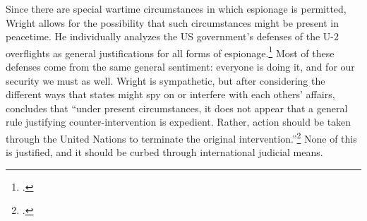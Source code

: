 \documentclass{memoir}
\begin{document}
\begin{refsegment}
Since there are special wartime circumstances in which espionage is permitted, Wright allows for the possibility that such circumstances might be present in peacetime. He individually analyzes the US government's defenses of the U-2 overflights as general justifications for all forms of espionage.\footcite[p.~17. A fun question to ask yourself is whether putting human spies and overflights in the same category elevates the severity of human intelligence or minimizes that of overflights. I think it actually does both, and Wright seems to agree. An overflying plane is clearly capable of greater physical destruction but ``the difference should not be exaggerated. Although a reconnaissance airplane may carry bombs, a secret agent may plant a bomb and engage in various forms of sabotage.'' (p. 21) The general lack of concern that a spy plane might be carrying bombs is consistently surprising to me. Many of these flights were in retrofitted bombers, completely indistinguishable to enemies from their heavily-armed counterparts. Nonethless, both sides seem willing to treat reconnaissance flights as their own separate thing, and that protection applies to spies as well. As long as spies \emph{don't} engage in sabotage, the fact that they have the potential to do so is irrelevant.]{wright_espionage_1962} Most of these defenses come from the same general sentiment: everyone is doing it, and for our security we must as well. Wright is sympathetic, but after considering the different ways that states might spy on or interfere with each others' affairs, concludes that ``under present circumstances, it does not appear that a general rule justifying counter-intervention is expedient. Rather, action should be taken through the United Nations to terminate the original intervention.''\footcite[p.~22]{wright_espionage_1962} None of this is justified, and it should be curbed through international judicial means.



\end{refsegment}
\end{document}
